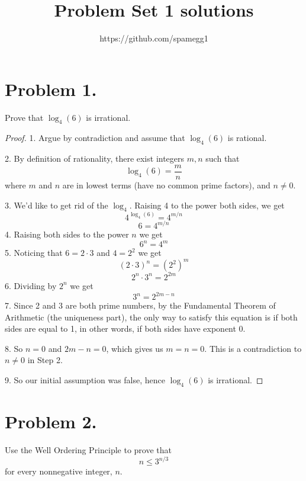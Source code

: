 \documentclass[14pt]{extarticle}
\title{Problem Set 1 solutions}
\author{https://github.com/spamegg1}
\begin{document}
\maketitle
\tableofcontents
\section{Problem 1.}
Prove that $\log_4(6)$ is irrational.
\begin{proof}
1. Argue by contradiction and assume that $\log_4(6)$ is rational.

2. By definition of rationality, there exist integers $m, n$ such that
$$
\log_4(6) = \frac{m}{n}
$$
where $m$ and $n$ are in lowest terms (have no common prime factors), and $n \neq 0$.

3. We'd like to get rid of the $\log_4$. Raising 4 to the power both sides, we get
$$
4^{\log_4(6)} = 4^{m/n}
$$
$$
6 = 4^{m/n}
$$
4. Raising both sides to the power $n$ we get
$$
6^n = 4^m
$$
5. Noticing that $6 = 2 \cdot 3$ and $4 = 2^2$ we get
$$
(2\cdot 3)^n = (2^2)^m
$$
$$
2^n\cdot 3^n = 2^{2m}
$$
6. Dividing by $2^n$ we get
$$
3^n = 2^{2m - n}
$$
7. Since 2 and 3 are both prime numbers, by the Fundamental Theorem of Arithmetic (the uniqueness part), the only way to satisfy this equation is if both sides are equal to 1, in other words, if both sides have exponent 0. 

8. So $n = 0$ and $2m - n = 0$, which gives us $m = n = 0$. This is a contradiction to $n \neq 0$ in Step 2.

9. So our initial assumption was false, hence $\log_4(6)$ is irrational.
\end{proof}

\section{Problem 2.}
Use the Well Ordering Principle to prove that
$$
n \leq 3^{n/3}
$$
for every nonnegative integer, $n$.
\end{document}
